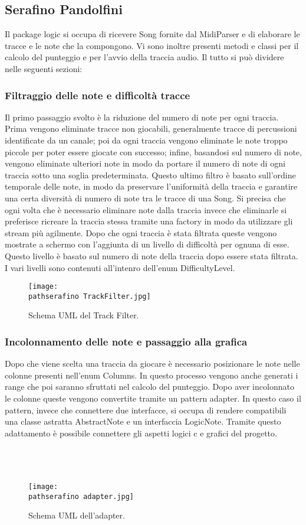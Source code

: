 \documentclass[a4paper,12pt]{report}
\newcommand\pathserafino{img/serafino/}
\begin{document}
\subsection{Serafino Pandolfini}
Il package logic si occupa di ricevere Song fornite dal MidiParser e di elaborare le tracce e le note che la compongono. Vi sono inoltre presenti metodi e classi per il calcolo del punteggio e per l'avvio della traccia audio. Il tutto si può dividere nelle seguenti sezioni:
\subsubsection{Filtraggio delle note e difficoltà tracce}
Il primo passaggio svolto è la riduzione del numero di note per ogni traccia. Prima vengono eliminate tracce non giocabili, generalmente tracce di percussioni identificate da un canale; poi da ogni traccia vengono eliminate le note troppo piccole per poter essere giocate con successo; infine, basandosi sul numero di note, vengono eliminate ulteriori note in modo da portare il numero di note di ogni traccia sotto una soglia predeterminata. Questo ultimo filtro è basato sull'ordine temporale delle note, in modo da preservare l'uniformità della traccia e garantire una certa diversità di numero di note tra le tracce di una Song. Si precisa che ogni volta che è necessario eliminare note dalla traccia invece che eliminarle si preferisce ricreare la traccia stessa tramite una factory in modo da utilizzare gli stream più agilmente.
Dopo che ogni traccia è stata filtrata queste vengono mostrate a schermo con l'aggiunta di un livello di difficoltà per ognuna di esse. Questo livello è basato sul numero di note della traccia dopo essere stata filtrata. I vari livelli sono contenuti all'intenro dell'enum DifficultyLevel.
\begin{figure}[!htb]
	\centerline{\texttt{[image: \\pathserafino TrackFilter.jpg]}}
	\caption{Schema UML del Track Filter.}
	\label{img:trackfilter}
\end{figure}
\clearpage \hfill\break
\subsubsection{Incolonnamento delle note e passaggio alla grafica}
Dopo che viene scelta una traccia da giocare è necessario posizionare le note nelle colonne presenti nell'enum Columns. In questo processo vengono anche generati i range che poi saranno sfruttati nel calcolo del punteggio. Dopo aver incolonnato le colonne queste vengono convertite tramite un pattern adapter. In questo caso il pattern, invece che connettere due interfacce, si occupa di rendere compatibili una classe astratta AbstractNote e un interfaccia LogicNote. Tramite questo adattamento è possibile connettere gli aspetti logici c e grafici del progetto. \\ \\ \\ \\
\begin{figure}[!htb]
	\centerline{\texttt{[image: \\pathserafino adapter.jpg]}}
	\caption{Schema UML dell'adapter.}
	\label{img:incollamentonote}
\end{figure}
\clearpage \hfill\break
\end{document}
